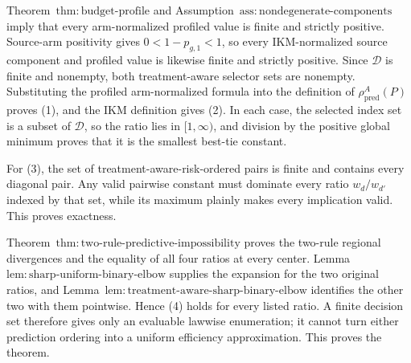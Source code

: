 Theorem~\(\mathrm{thm{:}budget\text{-}profile}\) and Assumption~\(\mathrm{ass{:}nondegenerate\text{-}components}\) imply that every arm-normalized profiled value is finite and strictly positive. Source-arm positivity gives \(0<1-p_{g,1}<1\), so every IKM-normalized source component and profiled value is likewise finite and strictly positive. Since \(\mathcal D\) is finite and nonempty, both treatment-aware selector sets are nonempty. Substituting the profiled arm-normalized formula into the definition of \(\rho_{\mathrm{pred}}^A(P)\) proves (1), and the IKM definition gives (2). In each case, the selected index set is a subset of \(\mathcal D\), so the ratio lies in \([1,\infty)\), and division by the positive global minimum proves that it is the smallest best-tie constant.

For (3), the set of treatment-aware-risk-ordered pairs is finite and contains every diagonal pair. Any valid pairwise constant must dominate every ratio \(w_d/w_{d'}\) indexed by that set, while its maximum plainly makes every implication valid. This proves exactness.

Theorem~\(\mathrm{thm{:}two\text{-}rule\text{-}predictive\text{-}impossibility}\) proves the two-rule regional divergences and the equality of all four ratios at every center. Lemma~\(\mathrm{lem{:}sharp\text{-}uniform\text{-}binary\text{-}elbow}\) supplies the expansion for the two original ratios, and Lemma~\(\mathrm{lem{:}treatment\text{-}aware\text{-}sharp\text{-}binary\text{-}elbow}\) identifies the other two with them pointwise. Hence (4) holds for every listed ratio. A finite decision set therefore gives only an evaluable lawwise enumeration; it cannot turn either prediction ordering into a uniform efficiency approximation. This proves the theorem.